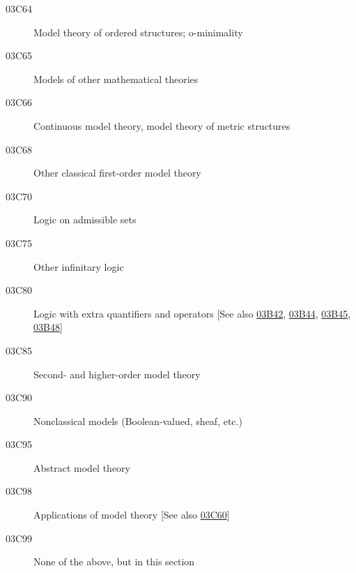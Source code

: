 \documentclass[letterpaper]{article}
\begin{document}
\begin{description}
\item [03C64]\label{03C64} Model theory of ordered structures; o-minimality
\item [03C65]\label{03C65} Models of other mathematical theories
\item [03C66]\label{03C66} Continuous model theory, model theory of metric structures
\item [03C68]\label{03C68} Other classical first-order model theory
\item [03C70]\label{03C70} Logic on admissible sets
\item [03C75]\label{03C75} Other infinitary logic
\item [03C80]\label{03C80} Logic with extra quantifiers and operators [See also \hyperref[03B42]{03B42}, \hyperref[03B44]{03B44}, \hyperref[03B45]{03B45}, \hyperref[03B48]{03B48}]
\item [03C85]\label{03C85} Second- and higher-order model theory
\item [03C90]\label{03C90} Nonclassical models (Boolean-valued, sheaf, etc.)
\item [03C95]\label{03C95} Abstract model theory
\item [03C98]\label{03C98} Applications of model theory [See also \hyperref[03C60]{03C60}]
\item [03C99]\label{03C99} None of the above, but in this section
\end{description}
\end{document}

